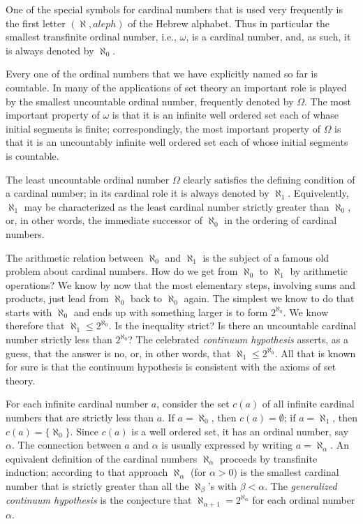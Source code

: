 One of the special symbols for cardinal numbers that is used very frequently is the first letter $(\aleph, aleph)$ of the Hebrew alphabet. Thus in particular the smallest transfinite ordinal number, i.e., $\omega$, is a cardinal number, and, as such, it is always denoted by $\aleph_{0}$.

Every one of the ordinal numbers that we have explicitly named so far is countable. In many of the applications of set theory an important role is played by the smallest uncountable ordinal number, frequently denoted by $\Omega$. The most important property of $\omega$ is that it is an infinite well ordered set each of whase initial segments is finite; correspondingly, the most important property of $\Omega$ is that it is an uncountably infinite well ordered set each of whose initial segments is countable. 

The least uncountable ordinal number $\Omega$ clearly  satisfies the defining condition of a cardinal number; in its cardinal role it is always denoted by $\aleph_{1}$. Equivelently, $\aleph_{1}$ may be characterized as the least cardinal number strictly greater than $\aleph_{0}$, or, in other words, the immediate successor of $\aleph_{0}$ in the ordering of cardinal numbers. 

The arithmetic relation between $\aleph_{0}$ and $\aleph_{1}$ is the subject of a famous old problem about cardinal numbers. How do we get from $\aleph_{0}$ to $\aleph_{1}$ by arithmetic operations? We know by now that the most elementary steps, involving sums and products, just lead from $\aleph_{0}$ back to $\aleph_{0}$ again. The simplest we know to do that starts with $\aleph_{0}$ and ends up with something larger is to form $2^{\aleph_{0}}$. We know therefore that $\aleph_{1} \le 2^{\aleph_{0}}$. Is the inequality strict? Is there an uncountable cardinal number strictly less than $2^{\aleph_{0}}$? The celebrated \textit{continuum hypothesis} asserts, as a guess, that the answer is no, or, in other words, that $\aleph_{1} \le 2^{\aleph_{0}}$. All that is known for sure is that the continuum hypothesis is consistent with the axioms of set theory. 

For each infinite cardinal number $a$, consider the set $c(a)$ of all infinite cardinal numbers that are strictly less than $a$. If $a = \aleph_{0}$, then $c(a) = \emptyset$; if $a = \aleph_{1}$, then $c(a) = \{ \aleph_{0} \}$. Since $c(a)$ is a well ordered set, it has an ordinal number, say $\alpha$. The connection between $a$ and $\alpha$ is usually expressed by writing $a = \aleph_{\alpha}$. An equivalent definition of the cardinal numbers $\aleph_{\alpha}$ proceeds by transfinite induction; according to that approach $\aleph_{\alpha}$ (for $\alpha > 0$) is the smallest cardinal number that is strictly greater than all the $\aleph_{\beta}$'s with $\beta < \alpha$. The \textit{generalized continuum hypothesis} is the conjecture that $\aleph_{\alpha + 1} = 2^{\aleph_{\alpha}}$ for each ordinal number $\alpha$.